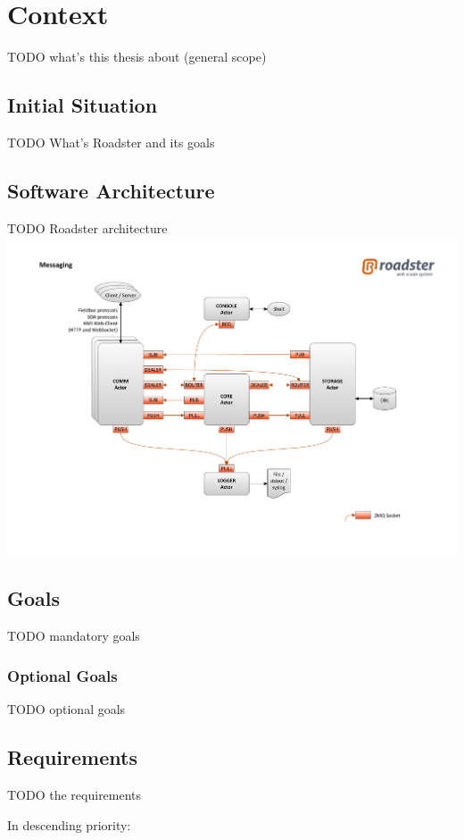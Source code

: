 \chapter{Context}
TODO what's this thesis about (general scope)

\section{Initial Situation}
TODO What's Roadster and its goals

\section{Software Architecture}
TODO Roadster architecture\\

\includegraphics[trim=4cm 2cm 3.5cm 2.8cm, clip=true, width=\textwidth]{img/roadster_arch.pdf}

\section{Goals}
TODO mandatory goals

\subsection*{Optional Goals}
TODO optional goals

\section{Requirements}
TODO the requirements

In descending priority:

